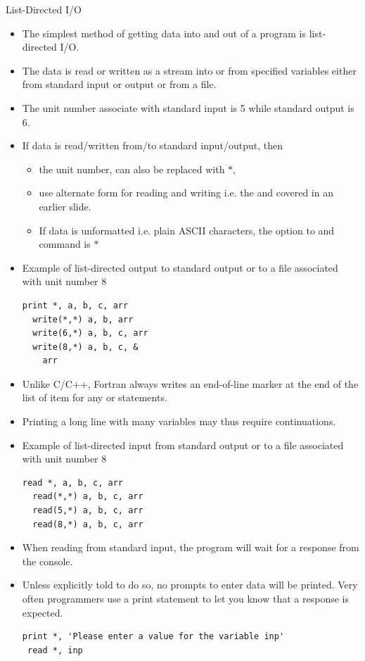 \documentclass[10pt,t]{beamer}
\begin{document}
\begin{frame}{List-Directed I/O}
  \begin{itemize}
    \item The simplest method of getting data into and out of a program is list-directed I/O.
    \item The data is read or written as a stream into or from specified variables either from standard input or output or from a file.
    \item The unit number associate with standard input is 5 while standard output is 6.
    \item If data is read/written from/to standard input/output, then
      \begin{itemize}
        \item the unit number,  can also be replaced with $\ast$,
        \item use alternate form for reading and writing i.e. the  and  covered in an earlier slide.
        \item If data is unformatted i.e. plain ASCII characters, the option to  and  command is $\ast$
      \end{itemize}
      \framebreak
    \item Example of list-directed output to standard output or to a file associated with unit number 8
      \begin{lstlisting}[language={[90]Fortran}]
  print *, a, b, c, arr
  write(*,*) a, b, arr
  write(6,*) a, b, c, arr
  write(8,*) a, b, c, &
    arr
      \end{lstlisting}
    \item Unlike C/C++, Fortran always writes an end-of-line marker at the end of the list of item for any  or  statements.
    \item Printing a long line with many variables may thus require continuations.
    \item Example of list-directed input from standard output or to a file associated with unit number 8
      \begin{lstlisting}[language={[90]Fortran}]
  read *, a, b, c, arr
  read(*,*) a, b, c, arr
  read(5,*) a, b, c, arr
  read(8,*) a, b, c, arr
      \end{lstlisting}
    \item When reading from standard input, the program will wait for a response from the console.
    \item Unless explicitly told to do so, no prompts to enter data will be printed. Very often programmers use a print statement to let you know that a response is expected.
      \begin{lstlisting}[language={[90]Fortran}]
 print *, 'Please enter a value for the variable inp'
 read *, inp
      \end{lstlisting}
  \end{itemize}
\end{frame}
\end{document}

